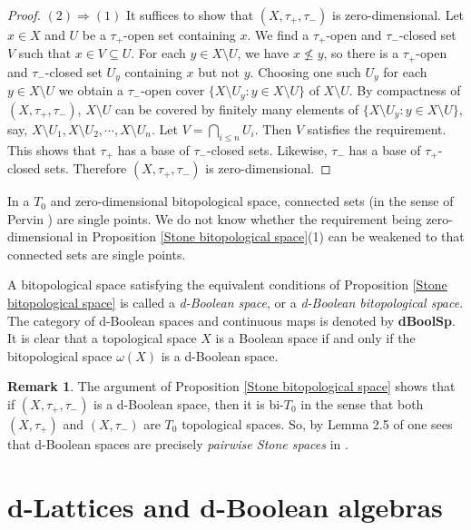 \documentclass[11pt]{article}
\theoremstyle{plain}
\theoremstyle{definition}
\newtheorem{rem}[thm]{Remark}
\begin{document}
\begin{proof}
$(2)\Rightarrow(1)$   It suffices to show that $(X,\tau_+,\tau_-)$ is zero-dimensional. Let $x\in X$ and $U$ be a $\tau_+$-open set containing $x$. We find a $\tau_+$-open and  $\tau_-$-closed set $V$ such that $x\in V\subseteq U$. For each $y\in X\setminus U$, we have $x\not\leq y$, so there is a $\tau_+$-open  and $\tau_-$-closed set $U_y$ containing $x$ but not $y$. Choosing one such $U_y$ for each $y\in X\setminus U$ we obtain a $\tau_-$-open cover $\{X\setminus U_y:y\in X\setminus U\}$ of $X\setminus U$. By  compactness of $(X,\tau_+,\tau_-)$, $X\setminus U$ can be covered by finitely many elements of $\{X\setminus U_y:y\in X\setminus U\}$, say, $X\setminus U_1, X\setminus U_2,\cdots, X\setminus U_n$. Let $V=\bigcap_{i\leq n}  U_i$. Then $V$ satisfies the requirement. This shows that $\tau_+$ has a base of $\tau_-$-closed sets.
Likewise, $\tau_-$ has a base of $\tau_+$-closed sets. Therefore  $(X,\tau_+,\tau_-)$ is zero-dimensional.
\end{proof} 

In a $T_0$ and zero-dimensional  bitopological space,  connected sets (in the sense of Pervin \cite{Pervin}) are single points. We do not know whether the requirement being zero-dimensional in Proposition \ref{Stone bitopological space}\thinspace(1) can be weakened to that connected sets are single points.

A bitopological space satisfying the equivalent conditions of Proposition \ref{Stone bitopological space} is called a  \emph{d-Boolean space}, or   a \emph{d-Boolean bitopological space}. The category of d-Boolean spaces and continuous maps is denoted by {\bf dBoolSp}. 
It is clear that a topological space $X$ is a Boolean space if and only if the bitopological space $\omega(X)$ is a d-Boolean space.  

\begin{rem} The argument of Proposition \ref{Stone bitopological space} shows that if $(X,\tau_+,\tau_-)$ is a d-Boolean space, then it is bi-$T_0$ in the sense that both $(X,\tau_+)$ and $(X, \tau_-)$ are $T_0$ topological spaces. So, by Lemma 2.5 of \cite{BBGK} one sees that d-Boolean spaces are precisely  \emph{pairwise Stone spaces} in  \cite[Definition 2.10]{BBGK}. \end{rem}

\section{d-Lattices and d-Boolean algebras} \label{dBA-section}
\end{document}
